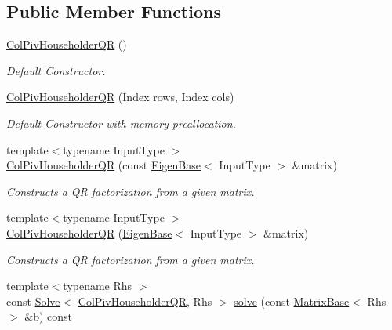 \subsection*{Public Member Functions}
\begin{DoxyCompactItemize}
\item 
\mbox{\hyperlink{class_eigen_1_1_col_piv_householder_q_r_a9d8a92c2a2f0debe5454812372237ed4}{Col\+Piv\+Householder\+QR}} ()
\begin{DoxyCompactList}\small\item\em Default Constructor. \end{DoxyCompactList}\item 
\mbox{\hyperlink{class_eigen_1_1_col_piv_householder_q_r_a5965d4fdebc04b2df71d67ff0b2d0c2c}{Col\+Piv\+Householder\+QR}} (Index rows, Index cols)
\begin{DoxyCompactList}\small\item\em Default Constructor with memory preallocation. \end{DoxyCompactList}\item 
{\footnotesize template$<$typename Input\+Type $>$ }\\\mbox{\hyperlink{class_eigen_1_1_col_piv_householder_q_r_a1aa6a5b95380df0ceb224cb833316d4f}{Col\+Piv\+Householder\+QR}} (const \mbox{\hyperlink{struct_eigen_1_1_eigen_base}{Eigen\+Base}}$<$ Input\+Type $>$ \&matrix)
\begin{DoxyCompactList}\small\item\em Constructs a QR factorization from a given matrix. \end{DoxyCompactList}\item 
{\footnotesize template$<$typename Input\+Type $>$ }\\\mbox{\hyperlink{class_eigen_1_1_col_piv_householder_q_r_a65782010a93a4c9ef4a9191ac8fe30bc}{Col\+Piv\+Householder\+QR}} (\mbox{\hyperlink{struct_eigen_1_1_eigen_base}{Eigen\+Base}}$<$ Input\+Type $>$ \&matrix)
\begin{DoxyCompactList}\small\item\em Constructs a QR factorization from a given matrix. \end{DoxyCompactList}\item 
{\footnotesize template$<$typename Rhs $>$ }\\const \mbox{\hyperlink{class_eigen_1_1_solve}{Solve}}$<$ \mbox{\hyperlink{class_eigen_1_1_col_piv_householder_q_r}{Col\+Piv\+Householder\+QR}}, Rhs $>$ \mbox{\hyperlink{class_eigen_1_1_col_piv_householder_q_r_aaa9c4af89930ab3bb7612ed9ae33d3f5}{solve}} (const \mbox{\hyperlink{class_eigen_1_1_matrix_base}{Matrix\+Base}}$<$ Rhs $>$ \&b) const

\end{DoxyCompactItemize}
